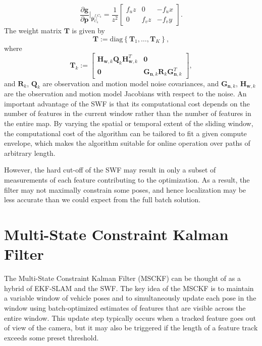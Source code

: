 \documentclass[letterpaper, 10 pt, conference]{ieeeconf}  %
\def\Vec#1{\mathbf{#1}}
\newcommand{\bbm}{\begin{bmatrix}}
\newcommand{\ebm}{\end{bmatrix}}
\newcommand{\pd}[2]{\frac{\partial #1}{\partial #2}}
\begin{document}
\begin{equation}
\pd{\Vec g}{ \Vec p}\Bigr|_{\bar{\Vec p}_{C_k}^{f_j C_k}} = \frac{1}{z^2} \bbm f_u z & 0 & - f_u x \\  0 & f_v z & -f_v y \ebm.
\end{equation}
The weight matrix $\Vec T$ is given by
\begin{equation}
\Vec{T} := \text{diag} \left\{ \Vec{T}_1,\hdots,\Vec{T}_K \right\},
\end{equation}
where
\begin{equation}
\Vec{T}_k := \bbm \Vec H_{\Vec w, k} \Vec Q_k \Vec H_{\Vec w, k}^T & \Vec 0 \\
\Vec 0 & \Vec G_{\Vec n, k} \Vec R_k \Vec G_{\Vec n, k}^T \ebm,
\end{equation}
and $\Vec R_k$, $\Vec Q_k$ are observation and motion model noise covariances, and $\Vec G_{\Vec n, k}$, $\Vec H_{\Vec w, k}$ are the observation and motion model Jacobians with respect to the noise. 
An important advantage of the SWF is that its computational cost depends on the number of features in the current window rather than the number of features in the entire map.
By varying the spatial or temporal extent of the sliding window, the computational cost of the algorithm can be tailored to fit a given compute envelope, which makes the algorithm suitable for online operation over paths of arbitrary length.

However, the hard cut-off of the SWF may result in only a subset of measurements of each feature contributing to the optimization.
As a result, the filter may not maximally constrain some poses, and hence localization may be less accurate than we could expect from the full batch solution.

\section{Multi-State Constraint Kalman Filter} \label{sec:MSCKF}
The Multi-State Constraint Kalman Filter (MSCKF) \cite{Mourikis:2006:TechReport,Mourikis:2007:ICRA} can be thought of as a hybrid of EKF-SLAM and the SWF.
The key idea of the MSCKF is to maintain a variable window of vehicle poses and to simultaneously update each pose in the window using batch-optimized estimates of features that are visible across the entire window.
This update step typically occurs when a tracked feature goes out of view of the camera, but it may also be triggered if the length of a feature track exceeds some preset threshold.
\end{document}
